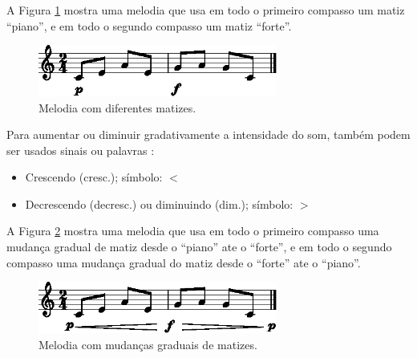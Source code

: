 \begin{example}
A Figura \ref{fig:matiz1-1} mostra uma melodia 
que usa em todo o primeiro compasso um matiz ``piano'',
e em todo o segundo compasso um matiz ``forte''.
\end{example}
\begin{figure}[!h]
\centering
 \includegraphics[width=0.7\textwidth]{chapters/cap-musica-basica/matiz1-1.eps}
\caption{Melodia com diferentes matizes.}
\label{fig:matiz1-1}
\end{figure}

Para aumentar ou diminuir gradativamente a intensidade do som,
também podem ser usados sinais ou palavras \cite[pp. 215]{medteoria} \cite[pp. 117]{mascarenhascurso}:
\begin{itemize}
\item Crescendo (cresc.); símbolo: $<$
\item Decrescendo (decresc.) ou diminuindo (dim.); símbolo: $>$
\end{itemize}

\begin{example}
A Figura \ref{fig:matiz2-1} mostra uma melodia 
que usa em todo o primeiro compasso uma mudança gradual de matiz desde o ``piano'' ate o ``forte'',
e em todo o segundo compasso uma mudança gradual do matiz desde o ``forte'' ate o ``piano''.
\end{example}
\begin{figure}[!h]
\centering
 \includegraphics[width=0.7\textwidth]{chapters/cap-musica-basica/matiz2-1.eps}
\caption{Melodia com mudanças graduais de matizes.}
\label{fig:matiz2-1}
\end{figure}



